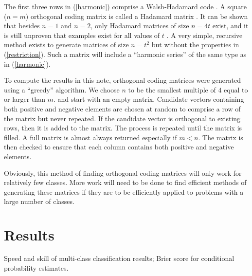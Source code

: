 The first three rows in (\ref{harmonic}) comprise a Walsh-Hadamard code \citep{Arora_Barak2009}.
A square ($n=m$) orthogonal coding matrix is called a Hadamard matrix
\citep{Sylvester1867}.
It can be shown that besides $n=1$ and $n=2$, only Hadamard matrices of size
$n=4t$ exist,  
and it is still unproven that examples exist for all values of $t$
\citep{Hedayat_Wallis1978}.
A very simple, recursive method exists to generate matrices of size $n=t^2$ 
\citep{Hedayat_Wallis1978} but without the properties in (\ref{restriction}).
Such a matrix will include a ``harmonic series'' of the same type as in
(\ref{harmonic}).


To compute the results in this note, orthogonal coding matrices were generated
using a ``greedy'' algorithm.
We choose $n$ to be the smallest multiple of $4$ equal to or larger than $m$.
and start with an empty matrix.
Candidate vectors containing both positive and negative elements 
are chosen at random to comprise a row of the matrix but never repeated.
If the candidate vector is orthogonal to existing rows, then it is added to the matrix.
The process is repeated until the matrix is filled.
A full matrix is almost always returned especially if $m<n$.
The matrix is then checked to ensure that 
each column contains both positive and negative elements.

Obviously, this method of finding orthogonal coding matrices
will only work for relatively few classes.
More work will need to be done to find efficient methods
of generating these matrices
if they are to be efficiently applied to problems with a large number of classes.


\section{Results}

\begin{table}
\caption{Speed and skill of multi-class classification results; Brier score for conditional probability estimates.}\label{class_results}

\end{table}

